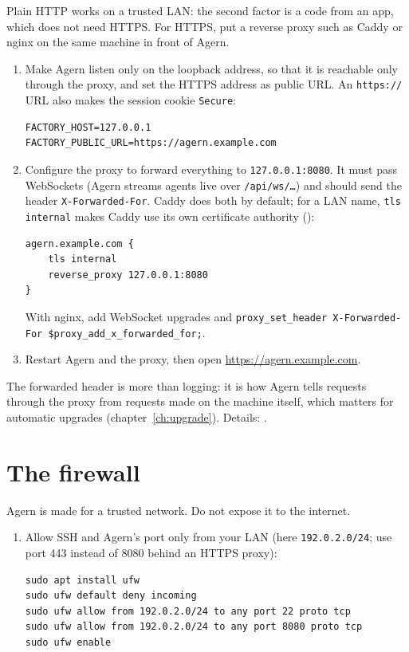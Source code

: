 Plain HTTP works on a trusted LAN: the second factor is a code from an app, which does not need
HTTPS. For HTTPS, put a reverse proxy such as Caddy or nginx on the same machine in front of
Agern.

\begin{enumerate}
  \item Make Agern listen only on the loopback address, so that it is reachable only through the
    proxy, and set the HTTPS address as public URL. An \texttt{https://} URL also makes the session
    cookie \texttt{Secure}:
\begin{lstlisting}[style=conf]
FACTORY_HOST=127.0.0.1
FACTORY_PUBLIC_URL=https://agern.example.com
\end{lstlisting}
  \item Configure the proxy to forward everything to \texttt{127.0.0.1:8080}. It must pass
    WebSockets (Agern streams agents live over \texttt{/api/ws/\ldots}) and should send the header
    \texttt{X-Forwarded-For}. Caddy does both by default; for a LAN name, \texttt{tls internal}
    makes Caddy use its own certificate authority ():
\begin{lstlisting}[style=conf]
agern.example.com {
    tls internal
    reverse_proxy 127.0.0.1:8080
}
\end{lstlisting}
    With nginx, add WebSocket upgrades and
    \texttt{proxy\_set\_header X-Forwarded-For \$proxy\_add\_x\_forwarded\_for;}.
  \item Restart Agern and the proxy, then open \url{https://agern.example.com}.
\end{enumerate}

The forwarded header is more than logging: it is how Agern tells requests through the proxy from
requests made on the machine itself, which matters for automatic upgrades
(chapter~\ref{ch:upgrade}). Details:
.

\section{The firewall}\label{sec:firewall}

Agern is made for a trusted network. Do not expose it to the internet.

\begin{enumerate}
  \item Allow SSH and Agern's port only from your LAN (here \texttt{192.0.2.0/24}; use port 443
    instead of 8080 behind an HTTPS proxy):
\begin{lstlisting}
sudo apt install ufw
sudo ufw default deny incoming
sudo ufw allow from 192.0.2.0/24 to any port 22 proto tcp
sudo ufw allow from 192.0.2.0/24 to any port 8080 proto tcp
sudo ufw enable
\end{lstlisting}
\end{enumerate}

